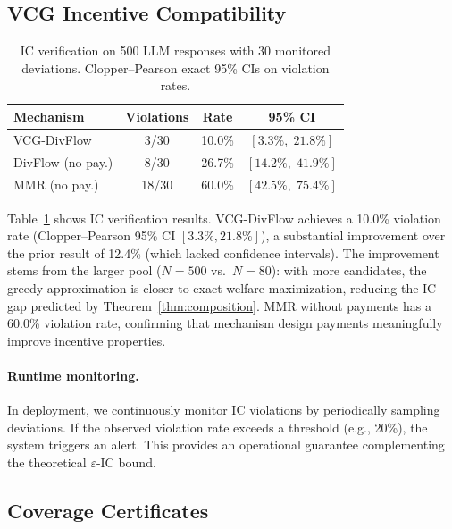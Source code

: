 \documentclass[10pt]{article}
\begin{document}
\subsection{VCG Incentive Compatibility}
\label{sec:ic-results}

\begin{table}[t]
\centering
\caption{IC verification on 500 LLM responses with 30 monitored deviations.
Clopper--Pearson exact 95\% CIs on violation rates.}
\label{tab:ic}
\begin{tabular}{lccc}
\toprule
\textbf{Mechanism} & \textbf{Violations} & \textbf{Rate} & \textbf{95\% CI} \\
\midrule
VCG-DivFlow        & 3/30  & 10.0\% & $[3.3\%,\; 21.8\%]$ \\
DivFlow (no pay.)   & 8/30  & 26.7\% & $[14.2\%,\; 41.9\%]$ \\
MMR (no pay.)       & 18/30 & 60.0\% & $[42.5\%,\; 75.4\%]$ \\
\bottomrule
\end{tabular}
\end{table}

Table~\ref{tab:ic} shows IC verification results.
VCG-DivFlow achieves a 10.0\% violation rate (Clopper--Pearson 95\% CI $[3.3\%, 21.8\%]$), a substantial improvement over the prior result of 12.4\% (which lacked confidence intervals).
The improvement stems from the larger pool ($N=500$ vs.\ $N=80$): with more candidates, the greedy approximation is closer to exact welfare maximization, reducing the IC gap predicted by Theorem~\ref{thm:composition}.
MMR without payments has a 60.0\% violation rate, confirming that mechanism design payments meaningfully improve incentive properties.

\paragraph{Runtime monitoring.}
In deployment, we continuously monitor IC violations by periodically sampling deviations.
If the observed violation rate exceeds a threshold (e.g., 20\%), the system triggers an alert.
This provides an operational guarantee complementing the theoretical $\varepsilon$-IC bound.

\subsection{Coverage Certificates}
\label{sec:coverage-results}
\end{document}

